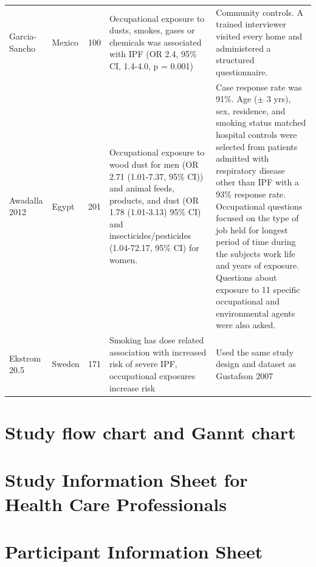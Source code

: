 \documentclass[a4paper,10pt]{article}
\begin{document}
\begin{appendices}
\begin{table}[htbp]
\begin{tabular}{p{1.3cm}p{0.8cm}p{0.8cm}p{6cm}p{5cm}}
Garcia-Sancho & Mexico & 100 & Occupational exposure to dusts, smokes, gases or chemicals was associated with IPF (OR 2.4, 95\% CI, 1.4-4.0, p = 0.001) & Community controls. A trained interviewer visited every home and administered a structured questionnaire. \\


Awadalla 2012 & Egypt & 201 & Occupational exposure to wood dust for men (OR 2.71 (1.01-7.37, 95\% CI)) and animal feeds, products, and dust (OR 1.78 (1.01-3.13) 95\% CI) and insecticides/pesticides (1.04-72.17, 95\% CI) for women. & Case response rate was 91\%. Age (\ensuremath{\pm} 3 yrs), sex, residence, and smoking status matched hospital controls were selected from patients admitted with respiratory disease other than IPF with a 93\% response rate. Occupational questions focused on the type of job held for longest period of time during the subjects work life and years of exposure. Questions about exposure to 11 specific occupational and environmental agents were also asked. \\

Ekstrom 20.5 & Sweden & 171 & Smoking has dose related association with increased risk of severe IPF, occupational exposures increase risk & Used the same study design and dataset as Gustafson 2007 \\


\bottomrule
\end{tabular}
\end{table}

\clearpage 

\section{Study flow chart and Gannt chart}




\section{Study Information Sheet for Health Care Professionals}

 \newpage

\section{Participant Information Sheet}
	


\end{appendices}
\end{document}
